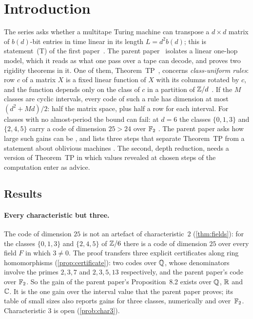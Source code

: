 \section{Introduction}\label{sec:intro}

The series asks whether a multitape Turing machine can transpose a $d\times d$ matrix of $b(d)$-bit entries in time
linear in its length $L=d^2b(d)$; this is statement~(T) of the first paper~\cite{FirstPaper2026}. The parent
paper~\cite{SeventeenthPaper2026} isolates a linear one-hop model, which it reads as what one pass over a tape can
decode, and proves two rigidity theorems in it. One of them, Theorem~TP~\cite[Theorem~6.4]{SeventeenthPaper2026},
concerns \emph{class-uniform rules}: row $c$ of a matrix $X$ is a fixed linear function of $X$ with its columns rotated
by $c$, and the function depends only on the class of $c$ in a partition of $\mathbb{Z}/d$
\cite[Definition~6.3]{SeventeenthPaper2026}. If the $M$ classes are cyclic intervals, every code of such a rule has
dimension at most $(d^2+Md)/2$: half the matrix space, plus half a row for each interval. For classes with no
almost-period the bound can fail: at $d=6$ the classes $\{0,1,3\}$ and $\{2,4,5\}$ carry a code of dimension $25>24$
over $\mathbb{F}_2$ \cite[Proposition~8.2]{SeventeenthPaper2026}. The parent paper asks how large such gains can be
\cite[Problem~9.1]{SeventeenthPaper2026}, and lists three steps that separate Theorem~TP from a statement about
oblivious machines \cite[Section~7.4]{SeventeenthPaper2026}. The second, depth reduction, needs a version of
Theorem~TP in which values revealed at chosen steps of the computation enter as advice.

\subsection{Results}

\paragraph{Every characteristic but three.} The code of dimension $25$ is not an artefact of characteristic~$2$
(\cref{thm:fields}): for the classes $\{0,1,3\}$ and $\{2,4,5\}$ of $\mathbb{Z}/6$ there is a code of dimension $25$ over every
field $F$ in which $3\ne0$. The proof transfers three explicit certificates along ring homomorphisms
(\cref{prop:certificate}): two codes over $\mathbb{Q}$, whose denominators involve the primes $2,3,7$ and $2,3,5,13$
respectively, and the parent paper's code over $\mathbb{F}_2$. So the gain of the parent paper's Proposition~8.2 exists over
$\mathbb{Q}$, $\mathbb{R}$ and $\mathbb{C}$. It is the one gain over the interval value that the parent paper proves; its table of small sizes
also reports gains for three classes, numerically and over~$\mathbb{F}_2$. Characteristic $3$ is open (\cref{prob:char3}).

